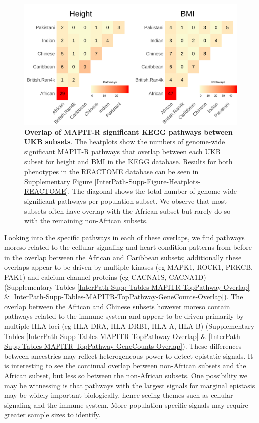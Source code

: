 \documentclass[12pt,a4paper]{article}
\begin{document}
\begin{figure}[htb]
\centering
\includegraphics[scale=.225]{Images/Main/InterPath_Main_Figure_Heatplots_KEGG_vs2.png}
\caption[TBD]{\textbf{Overlap of MAPIT-R significant KEGG pathways between UKB subsets}. The heatplots show the numbers of genome-wide significant MAPIT-R pathways that overlap between each UKB subset for height and BMI in the KEGG database. Results for both phenotypes in the REACTOME database can be seen in Supplementary Figure \ref{InterPath-Supp-Figure-Heatplots-REACTOME}. The diagonal shows the total number of genome-wide significant pathways per population subset. We observe that most subsets often have overlap with the African subset but rarely do so with the remaining non-African subsets.}
\label{InterPath-Main-Figure-Heatplots-KEGG}
\end{figure}

Looking into the specific pathways in each of these overlaps, we find pathways moreso related to the cellular signaling and heart condition patterns from before in the overlap between the African and Caribbean subsets; additionally these overlaps appear to be driven by multiple kinases (eg MAPK1, ROCK1, PRKCB, PAK1) and calcium channel proteins (eg CACNA1S, CACNA1D) (Supplementary Tables \ref{InterPath-Supp-Tables-MAPITR-TopPathway-Overlap} \& \ref{InterPath-Supp-Tables-MAPITR-TopPathway-GeneCounts-Overlap}). The overlap between the African and Chinese subsets however moreso contain pathways related to the immune system and appear to be driven primarily by multiple HLA loci (eg HLA-DRA, HLA-DRB1, HLA-A, HLA-B) (Supplementary Tables \ref{InterPath-Supp-Tables-MAPITR-TopPathway-Overlap} \& \ref{InterPath-Supp-Tables-MAPITR-TopPathway-GeneCounts-Overlap}). These differences between ancestries may reflect heterogeneous power to detect epistatic signals. It is interesting to see the continual overlap between non-African subsets and the African subset, but less so between the non-African subsets. One possibility we may be witnessing is that pathways with the largest signals for marginal epistasis may be widely important biologically, hence seeing themes such as cellular signaling and the immune system. More population-specific signals may require greater sample sizes to identify. 
\end{document}
